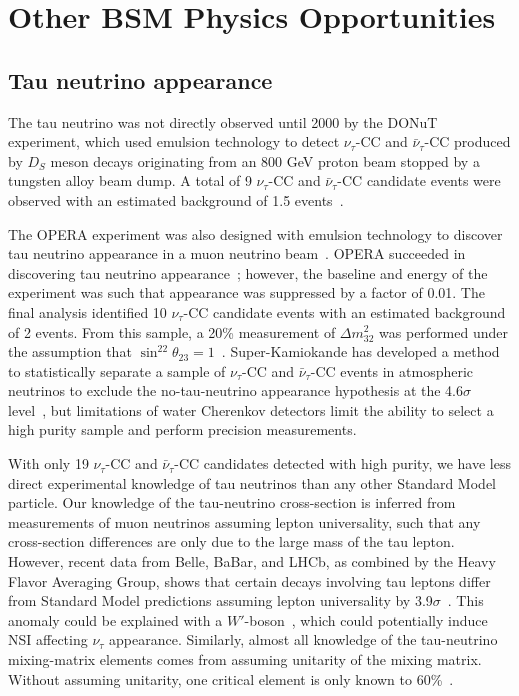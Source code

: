 \section{Other BSM Physics Opportunities}

\subsection{Tau neutrino appearance} The tau neutrino was not directly observed until 2000 by the DONuT experiment, which used emulsion technology to detect  $\nu_{\tau}$-CC and $\bar{\nu}_{\tau}$-CC produced by $D_S$ meson decays originating from an 800 GeV proton beam stopped by a tungsten alloy beam dump.  A total of 9 $\nu_{\tau}$-CC and $\bar{\nu}_{\tau}$-CC candidate events were observed with an estimated background of 1.5 events~\cite{Kodama:2000mp, Kodama:2007aa}.

The OPERA experiment was also designed with emulsion technology to discover tau neutrino appearance in a muon neutrino beam~\cite{Guler:2000bd}. OPERA succeeded in discovering tau neutrino appearance~\cite{Agafonova:2015jxn}; however, the baseline and energy of the experiment was such that appearance was suppressed by a factor of 0.01.   The final analysis identified 10 $\nu_{\tau}$-CC candidate events with an estimated background of 2 events.  From this sample, a 20\% measurement of $\Delta m^{2}_{32}$ was performed under the assumption that $\sin^22\theta_{23} = 1$~\cite{Agafonova:2018auq}.  Super-Kamiokande has developed a method to statistically separate a sample of $\nu_{\tau}$-CC and $\bar{\nu}_{\tau}$-CC events in atmospheric neutrinos to exclude the no-tau-neutrino appearance hypothesis at the 4.6$\sigma$ level~\cite{Abe:2012jj, Li:2017dbe}, but limitations of water Cherenkov detectors limit the ability to select a high purity sample and perform precision measurements.

With only 19 $\nu_{\tau}$-CC and $\bar{\nu}_{\tau}$-CC candidates detected with high purity, we have less direct experimental knowledge of tau neutrinos than any other Standard Model particle. Our knowledge of the tau-neutrino cross-section is inferred from measurements of muon neutrinos assuming lepton universality, such that any cross-section differences are only due to the large mass of the tau lepton. However, recent data from Belle, BaBar, and LHCb, as combined by the Heavy Flavor Averaging Group, shows that certain decays involving tau leptons differ from Standard Model predictions assuming lepton universality by 3.9$\sigma$~\cite{Amhis:2016xyh}.  This anomaly could be explained with a $W'$-boson~\cite{Greljo:2018ogz}, which could potentially induce NSI affecting $\nu_{\tau}$ appearance.  Similarly, almost all knowledge of the tau-neutrino mixing-matrix elements comes from assuming unitarity of the mixing matrix. Without assuming unitarity, one critical element is only known to 60\%~\cite{Parke:2015goa}.

